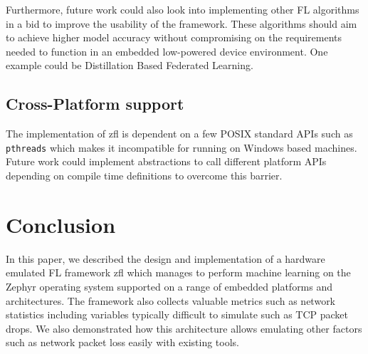 \documentclass[12pt]{article}
\begin{document}
Furthermore, future work could also look into implementing other FL algorithms in a bid to improve
the usability of the framework. These algorithms should aim to achieve higher model accuracy without
compromising on the requirements needed to function in an embedded low-powered device environment.
One example could be Distillation Based Federated Learning\cite{liu2022efficient}.

\subsection{Cross-Platform support}
The implementation of zfl is dependent on a few POSIX standard APIs such as \verb|pthreads| which makes it incompatible for
running on Windows based machines. Future work could implement abstractions to call different
platform APIs depending on compile time definitions to overcome this barrier.

\section{Conclusion}
In this paper, we described the design and implementation of a hardware emulated FL framework zfl
which manages to perform machine learning on the Zephyr operating system supported on
a range of embedded platforms and architectures. The framework also collects valuable metrics such
as network statistics including variables typically difficult to simulate such as TCP packet drops.
We also demonstrated how this architecture allows emulating other factors such as network packet loss
easily with existing tools.

\pagebreak
{}


\end{document}
